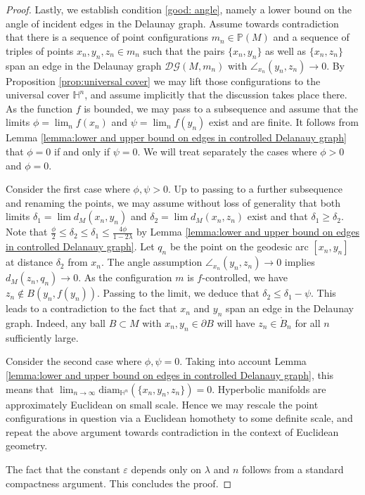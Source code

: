 \documentclass{amsart}
\newcommand{\HH}{\mathbb{H}}
\newcommand{\Points}{\mathbb{P}}
\newcommand{\DelanGraph}{\mathcal{DG}}
\theoremstyle{plain}
\numberwithin{equation}{section}
\theoremstyle{definition}
\begin{document}
\begin{proof}
Lastly, we establish condition \ref{good: angle}, namely a lower bound on the angle of incident edges in the Delaunay graph.
Assume towards contradiction that there is a sequence of point configurations $m_n \in \Points (M)$ and a sequence of triples of points $x_n,y_n,z_n \in m_n$ such that the pairs $\{x_n,y_n\}$ as well as $\{x_n,z_n\}$ span an edge in the Delaunay graph $\DelanGraph(M,m_n)$ with $\angle_{x_n}(y_n,z_n)\to 0$. 
By Proposition \ref{prop:universal cover} we may lift those configurations to the universal cover $\HH^n$, and assume implicitly that the discussion takes place there.
As the function $f$ is bounded, we may pass to a subsequence and assume that the limits $\phi = \lim_n f(x_n)$ and $\psi = \lim_n f(y_n)$ exist and are finite. It follows from Lemma \ref{lemma:lower and upper bound on edges in controlled Delanauy graph} that $\phi = 0$ if and only if $\psi = 0$. We will treat separately the cases where $\phi > 0 $ and $\phi = 0$.


Consider the first case where  $\phi,\psi > 0$. 
Up to passing to a further subsequence and renaming the points, we may assume without loss of generality that both limits $\delta_1 = \lim d_M(x_n,y_n) $ and $\delta_2 = \lim d_M(x_n,z_n) $ exist and that $\delta_1 \ge \delta_2$. Note that $\frac{\phi}{2} \le \delta_2 \le  \delta_1 \le \frac{4\phi}{1-2 \lambda}$ by Lemma \ref{lemma:lower and upper bound on edges in controlled Delanauy graph}. Let $q_n$ be the point on the geodesic arc $\left[x_n,y_n\right]$ at distance $\delta_2$ from $x_n$.  The angle assumption  $\angle_{x_n}(y_n,z_n)\to 0$ implies $d_M(z_n,q_n)\to 0$. As the configuration $m$ is $f$-controlled, we have $z_n \notin B(y_n,f(y_n))$. Passing to the limit, we deduce that $\delta_2 \le \delta_1 - \psi$. This leads to a contradiction to the fact that $x_n$ and $y_n$ span an edge in  the Delaunay graph. Indeed, any ball $B \subset M$ with $x_n,y_n \in \partial B$ will have $z_n \in \mathring B_n$ for all $n$ sufficiently large.

Consider the second case where $\phi,\psi = 0$. Taking into account Lemma \ref{lemma:lower and upper bound on edges in controlled Delanauy graph}, this means that $\lim_{n\to\infty} \mathrm{diam}_{\HH^n}(\{x_n,y_n,z_n\})= 0 $. Hyperbolic manifolds are approximately Euclidean on small scale. Hence we may rescale the point configurations in question via a Euclidean homothety to some definite scale, and repeat the above argument towards contradiction in the context of Euclidean geometry.

The fact that the constant $\varepsilon$ depends only on $\lambda$ and $n$ follows from a standard compactness argument.
 This concludes the proof.
\end{proof}
\end{document}
